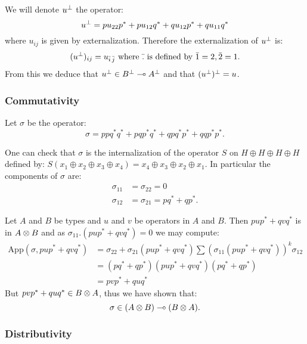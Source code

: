 We will denote \(u^\bot\) the operator:
\begin{equation*}
u^\bot = pu_{22}p^* + pu_{12}q^* + qu_{12}p^* + qu_{11}q^*
\end{equation*}
where \(u_{ij}\) is given by externalization. Therefore the
externalization of \(u^\bot\) is:
\begin{equation*}
(u^\bot)_{ij} = u_{\bar i\,\bar j}\text{ where $\bar .$ is defined by $\bar1 = 2, \bar2 = 1$}.
\end{equation*}
From this we deduce that \(u^\bot\in B^\bot\multimap A^\bot\) and that
\((u^\bot)^\bot = u\).

\subsubsection{Commutativity}\label{commutativity}

Let \(\sigma\) be the operator:
\begin{equation*}
\sigma = ppq^*q^* +pqp^*q^* + qpq^*p^* + qqp^*p^*.
\end{equation*}

One can check that \(\sigma\) is the internalization of the operator
\(S\) on \(H\oplus H\oplus H\oplus H\) defined by:
\(S(x_1\oplus x_2\oplus x_3\oplus x_4) = x_4\oplus x_3\oplus x_2\oplus x_1\).
In particular the components of \(\sigma\) are:
\begin{align*}
\sigma_{11} &= \sigma_{22} = 0 \\
\sigma_{12} &= \sigma_{21} = pq^* + qp^*.
\end{align*}

Let \(A\) and \(B\) be types and \(u\) and \(v\) be operators in \(A\)
and \(B\). Then \(pup^* + qvq^*\) is in \(A\otimes B\) and as
\(\sigma_{11}.(pup^* + qvq^*) = 0\) we may compute:
\begin{align*}
    \mathrm{App}(\sigma, pup^* + qvq^*) 
      & = \sigma_{22} + \sigma_{21}(pup^* + qvq^*)\sum(\sigma_{11}(pup^* + qvq^*))^k\sigma_{12}\\
      & = (pq^* + qp^*)(pup^* + qvq^*)(pq^* + qp^*)\\
      & = pvp^* + quq^*
\end{align*}
But \(pvp^* + quq^*\in B\otimes A\), thus we have shown that:
\begin{equation*}
\sigma\in (A\otimes B) \multimap (B\otimes A).
\end{equation*}

\subsubsection{Distributivity}\label{distributivity}

